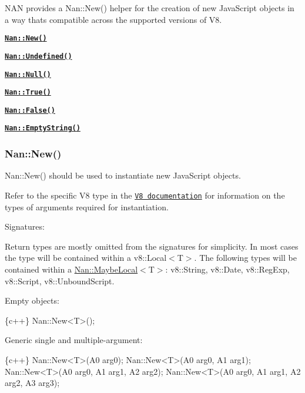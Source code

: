 N\+AN provides a {\ttfamily Nan\+::\+New()} helper for the creation of new Java\+Script objects in a way that\textquotesingle{}s compatible across the supported versions of V8.


\begin{DoxyItemize}
\item \href{#api_nan_new}{\tt {\bfseries {\ttfamily Nan\+::\+New()}}}
\item \href{#api_nan_undefined}{\tt {\bfseries {\ttfamily Nan\+::\+Undefined()}}}
\item \href{#api_nan_null}{\tt {\bfseries {\ttfamily Nan\+::\+Null()}}}
\item \href{#api_nan_true}{\tt {\bfseries {\ttfamily Nan\+::\+True()}}}
\item \href{#api_nan_false}{\tt {\bfseries {\ttfamily Nan\+::\+False()}}}
\item \href{#api_nan_empty_string}{\tt {\bfseries {\ttfamily Nan\+::\+Empty\+String()}}}
\end{DoxyItemize}

\label{_api_nan_new}%
 \subsubsection*{Nan\+::\+New()}

{\ttfamily Nan\+::\+New()} should be used to instantiate new Java\+Script objects.

Refer to the specific V8 type in the \href{https://v8docs.nodesource.com/io.js-3.0/d1/d83/classv8_1_1_data.html}{\tt V8 documentation} for information on the types of arguments required for instantiation.

Signatures\+:

Return types are mostly omitted from the signatures for simplicity. In most cases the type will be contained within a {\ttfamily v8\+::\+Local$<$T$>$}. The following types will be contained within a {\ttfamily \hyperlink{class_nan_1_1_maybe_local}{Nan\+::\+Maybe\+Local}$<$T$>$}\+: {\ttfamily v8\+::\+String}, {\ttfamily v8\+::\+Date}, {\ttfamily v8\+::\+Reg\+Exp}, {\ttfamily v8\+::\+Script}, {\ttfamily v8\+::\+Unbound\+Script}.

Empty objects\+:


\begin{DoxyCode}
\{c++\}
Nan::New<T>();
\end{DoxyCode}


Generic single and multiple-\/argument\+:


\begin{DoxyCode}
\{c++\}
Nan::New<T>(A0 arg0);
Nan::New<T>(A0 arg0, A1 arg1);
Nan::New<T>(A0 arg0, A1 arg1, A2 arg2);
Nan::New<T>(A0 arg0, A1 arg1, A2 arg2, A3 arg3);
\end{DoxyCode}


